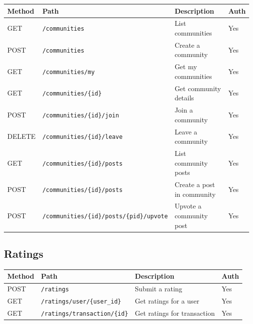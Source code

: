 \documentclass[10pt,a4paper]{report}
\begin{document}
\begin{longtable}{|l|p{4.5cm}|p{5cm}|l|}
    \hline
    \textbf{Method} & \textbf{Path}                                   & \textbf{Description}          & \textbf{Auth} \\
    \hline
    \endhead
    GET             & \texttt{/communities}                           & List communities              & Yes           \\
    \hline
    POST            & \texttt{/communities}                           & Create a community            & Yes           \\
    \hline
    GET             & \texttt{/communities/my}                        & Get my communities            & Yes           \\
    \hline
    GET             & \texttt{/communities/\{id\}}                    & Get community details         & Yes           \\
    \hline
    POST            & \texttt{/communities/\{id\}/join}               & Join a community              & Yes           \\
    \hline
    DELETE          & \texttt{/communities/\{id\}/leave}              & Leave a community             & Yes           \\
    \hline
    GET             & \texttt{/communities/\{id\}/posts}              & List community posts          & Yes           \\
    \hline
    POST            & \texttt{/communities/\{id\}/posts}              & Create a post in community    & Yes           \\
    \hline
    POST            & \texttt{/communities/\{id\}/posts/\{pid\}/upvote} & Upvote a community post     & Yes           \\
    \hline
\end{longtable}

\subsection{Ratings}

\begin{longtable}{|l|p{4.5cm}|p{5cm}|l|}
    \hline
    \textbf{Method} & \textbf{Path}                                 & \textbf{Description}         & \textbf{Auth} \\
    \hline
    \endhead
    POST            & \texttt{/ratings}                             & Submit a rating              & Yes           \\
    \hline
    GET             & \texttt{/ratings/user/\{user\_id\}}           & Get ratings for a user       & Yes           \\
    \hline
    GET             & \texttt{/ratings/transaction/\{id\}}          & Get ratings for transaction  & Yes           \\
    \hline
\end{longtable}
\end{document}
